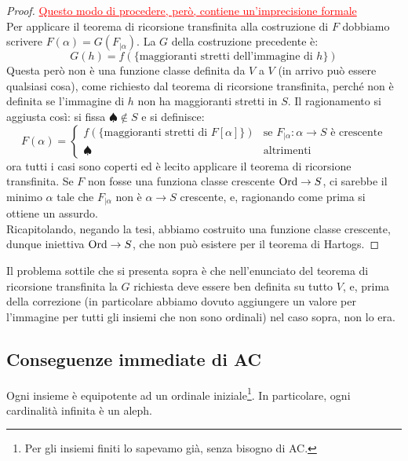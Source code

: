 \begin{proof}
	\textcolor{red}{\underline{Questo modo di procedere, però, contiene un'imprecisione formale}}\\
	Per applicare il teorema di ricorsione transfinita alla costruzione di $F$ dobbiamo scrivere $F(\alpha) = G(F_{|\alpha})$. La $G$ della costruzione precedente è:
	\[ G(h) = f(\{\text{maggioranti stretti dell'immagine di $h$}\})
		\]
	Questa però non è una funzione classe definita da $V$ a $V$ (in arrivo può essere qualsiasi cosa), come richiesto dal teorema di ricorsione transfinita, perché non è definita se l'immagine di $h$ non ha maggioranti stretti in $S$. Il ragionamento si aggiusta così: si fissa $\spadesuit \not \in S$ e si definisce:
	\[ F(\alpha) = \begin{cases}
		f(\{\text{maggioranti stretti di $F[\alpha]$}\}) &\text{se $F_{|\alpha} : \alpha \to S$ è crescente} \\
		\spadesuit &\text{altrimenti}
	\end{cases}
		\] 
	ora tutti i casi sono coperti ed è lecito applicare il teorema di ricorsione transfinita. Se $F$ non fosse una funziona classe crescente $\operatorname{Ord} \to S$, ci sarebbe il minimo $\alpha$ tale che $F_{|\alpha}$ non è
	$\alpha \to S$ crescente, e, ragionando come prima si ottiene un assurdo.\\
	Ricapitolando, negando la tesi, abbiamo costruito una funzione classe crescente, dunque iniettiva $\operatorname{Ord} \to S$, che non può esistere per il teorema di Hartogs.
\end{proof}

\begin{remark}
	Il problema sottile che si presenta sopra è che nell'enunciato del teorema di ricorsione transfinita la $G$ richiesta deve essere ben definita su tutto $V$, e, prima della correzione (in particolare abbiamo dovuto aggiungere un valore per l'immagine 
	per tutti gli insiemi che non sono ordinali) nel caso sopra, non lo era.
\end{remark}

\pagebreak
\subsection{Conseguenze immediate di AC}

\begin{proposition}
	Ogni insieme è equipotente ad un ordinale iniziale\footnote{Per gli insiemi finiti lo sapevamo già, senza bisogno di AC.}. In particolare, ogni cardinalità infinita è un aleph.
\end{proposition}

